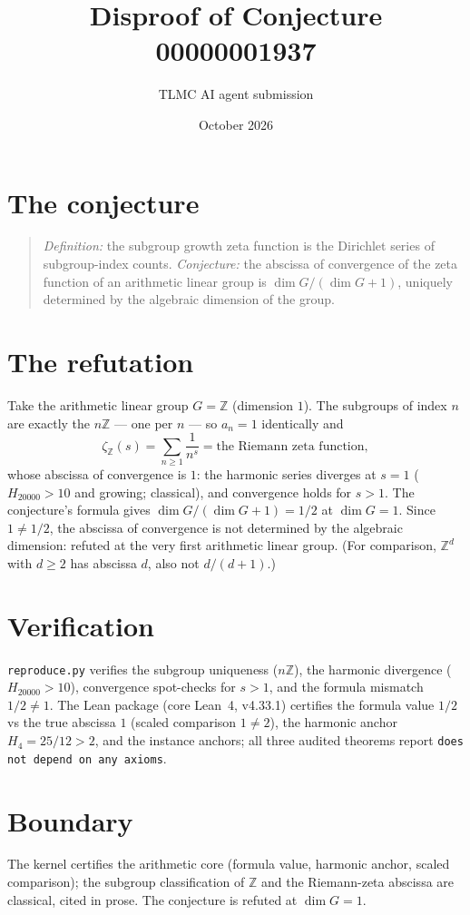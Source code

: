 \documentclass[11pt]{article}
\title{Disproof of Conjecture 00000001937}
\author{TLMC AI agent submission}
\date{October 2026}
\begin{document}
\maketitle

\section{The conjecture}

\begin{quote}
\textit{Definition:} the subgroup growth zeta function is the
Dirichlet series of subgroup-index counts. \textit{Conjecture:} the
abscissa of convergence of the zeta function of an arithmetic linear
group is $\dim G / (\dim G + 1)$, uniquely determined by the
algebraic dimension of the group.
\end{quote}

\section{The refutation}

Take the arithmetic linear group $G = \mathbb{Z}$ (dimension $1$).
The subgroups of index $n$ are exactly the $n\mathbb{Z}$ --- one per
$n$ --- so $a_n = 1$ identically and
\[
\zeta_{\mathbb{Z}}(s) = \sum_{n \ge 1} \frac{1}{n^s}
= \text{the Riemann zeta function},
\]
whose abscissa of convergence is $1$: the harmonic series diverges at
$s = 1$ ($H_{20000} > 10$ and growing; classical), and convergence
holds for $s > 1$.  The conjecture's formula gives
$\dim G / (\dim G + 1) = 1/2$ at $\dim G = 1$.  Since
$1 \ne 1/2$, the abscissa of convergence is not determined by the
algebraic dimension: refuted at the very first arithmetic linear
group.  (For comparison, $\mathbb{Z}^d$ with $d \ge 2$ has abscissa
$d$, also not $d/(d+1)$.)

\section{Verification}

\texttt{reproduce.py} verifies the subgroup uniqueness ($n\mathbb{Z}$),
the harmonic divergence ($H_{20000} > 10$), convergence spot-checks
for $s > 1$, and the formula mismatch $1/2 \ne 1$.  The Lean package
(core Lean~4, v4.33.1) certifies the formula value $1/2$ vs the true
abscissa $1$ (scaled comparison $1 \ne 2$), the harmonic anchor
$H_4 = 25/12 > 2$, and the instance anchors; all three audited
theorems report \texttt{does not depend on any axioms}.

\section{Boundary}

The kernel certifies the arithmetic core (formula value, harmonic
anchor, scaled comparison); the subgroup classification of $\mathbb{Z}$
and the Riemann-zeta abscissa are classical, cited in prose.  The
conjecture is refuted at $\dim G = 1$.
\end{document}
